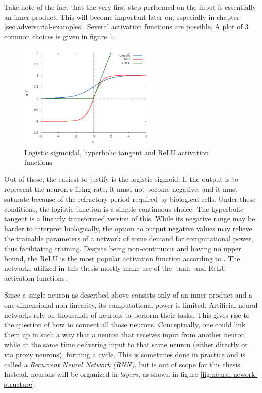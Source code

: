 \documentclass[11pt, a4paper]{article}
\begin{document}
Take note of the fact that the very first step performed on the input is essentially an inner product. This will become important later on, especially in chapter \ref{sec:adversarial-examples}. Several activation functions are possible. A plot of 3 common choices is given in figure \ref{fig:activation-functions}.

\begin{figure}[htp]
	\centering
	\includegraphics[width=0.6\textwidth]{images/activation_functions.png}
	\caption{Logistic sigmoidal, hyperbolic tangent and ReLU activation functions}
	\label{fig:activation-functions}
\end{figure}

Out of these, the easiest to justify is the logistic sigmoid. If the output is to represent the neuron's firing rate, it must not become negative, and it must saturate because of the refractory period required by biological cells. Under these conditions, the logistic function is a simple continuous choice. The hyperbolic tangent is a linearly transformed version of this. While its negative range may be harder to interpret biologically, the option to output negative values may relieve the trainable parameters of a network of some demand for computational power, thus facilitating training. Despite being non-continuous and having no upper bound, the ReLU is the most popular activation function according to \cite{deep-learning}. The networks utilized in this thesis mostly make use of the $\tanh$ and ReLU activation functions.

Since a single neuron as described above consists only of an inner product and a one-dimensional non-linearity, its computational power is limited. Artificial neural networks rely on thousands of neurons to perform their tasks. This gives rise to the question of how to connect all those neurons. Conceptually, one could link them up in such a way that a neuron that receives input from another neuron while at the same time delivering input to that same neuron (either directly or via proxy neurons), forming a cycle. This is sometimes done in practice and is called a \emph{Recurrent Neural Network (RNN)}, but is out of scope for this thesis. Instead, neurons will be organized in \emph{layers}, as shown in figure \ref{fig:neural-nework-structure}. %
\end{document}
